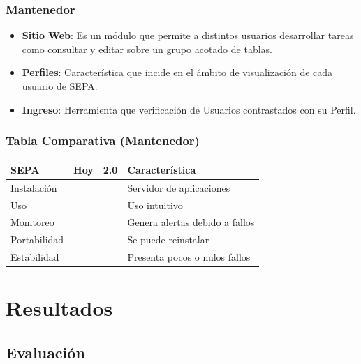 \documentclass{beamer}
\newcommand{\cmark}{\ding{51}}%
\newcommand{\xmark}{\ding{55}}%
\begin{document}

\begin{frame}
\frametitle{Mantenedor}
\begin{itemize}
\item \textbf{Sitio Web}: Es un módulo que permite a distintos usuarios desarrollar tareas como consultar y editar sobre un grupo acotado de tablas.
\item \textbf{Perfiles}: Característica que incide en el ámbito de visualización de cada usuario de SEPA.
\item \textbf{Ingreso}: Herramienta que verificación de Usuarios contrastados con su Perfil.
\end{itemize}
\end{frame}


\begin{frame}
\frametitle{Tabla Comparativa (Mantenedor)}
\begin{table}
\begin{tabular}{l l l l}
\toprule
\textbf{SEPA} & \textbf{Hoy} & \textbf{2.0} & Característica\\
\midrule
Instalación 	& \textcolor{red}{\xmark}   & \textcolor{green}{\cmark} & Servidor de aplicaciones  \\
Uso		 		& \textcolor{red}{\xmark}   & \textcolor{green}{\cmark} & Uso intuitivo \\
Monitoreo 		& \textcolor{red}{\xmark}   & \textcolor{green}{\cmark} & Genera alertas debido a fallos \\
Portabilidad 	& \textcolor{red}{\xmark}   & \textcolor{green}{\cmark} & Se puede reinstalar \\
Estabilidad 	& \textcolor{red}{\xmark}   & \textcolor{green}{\cmark} & Presenta pocos o nulos fallos \\
\bottomrule
\end{tabular}
\end{table}
\end{frame}


\section{Resultados} 

\subsection{Evaluación}
\end{document}
